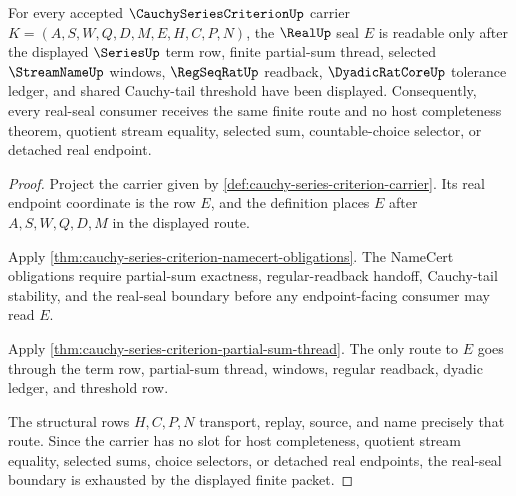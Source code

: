 \begin{theorem}\label{thm:cauchy-series-criterion-real-seal-boundary}
For every accepted $\CauchySeriesCriterionUp$ carrier $K=(A,S,W,Q,D,M,E,H,C,P,N)$, the $\RealUp$ seal $E$ is readable only after the displayed $\SeriesUp$ term row, finite partial-sum thread, selected $\StreamNameUp$ windows, $\RegSeqRatUp$ readback, $\DyadicRatCoreUp$ tolerance ledger, and shared Cauchy-tail threshold have been displayed. Consequently, every real-seal consumer receives the same finite route and no host completeness theorem, quotient stream equality, selected sum, countable-choice selector, or detached real endpoint.
\end{theorem}
\begin{proof}
Project the carrier given by \autoref{def:cauchy-series-criterion-carrier}. Its real endpoint coordinate is the row $E$, and the definition places $E$ after $A,S,W,Q,D,M$ in the displayed route.

Apply \autoref{thm:cauchy-series-criterion-namecert-obligations}. The NameCert obligations require partial-sum exactness, regular-readback handoff, Cauchy-tail stability, and the real-seal boundary before any endpoint-facing consumer may read $E$.

Apply \autoref{thm:cauchy-series-criterion-partial-sum-thread}. The only route to $E$ goes through the term row, partial-sum thread, windows, regular readback, dyadic ledger, and threshold row.

The structural rows $H,C,P,N$ transport, replay, source, and name precisely that route. Since the carrier has no slot for host completeness, quotient stream equality, selected sums, choice selectors, or detached real endpoints, the real-seal boundary is exhausted by the displayed finite packet.
\end{proof}



